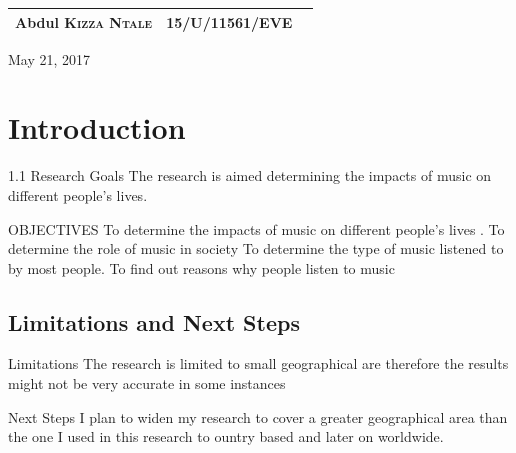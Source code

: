 \documentclass[12pt, a4paper]{report}
\begin{document}
\begin{titlepage}

\begin{table}[!hb]
\centering
\begin{tabular}{|l|l|l|}
\hline
Abdul \textsc{Kizza Ntale} & \textsc{15/U/11561/EVE} \\ \hline

\end{tabular}
\end{table}

{\large May 21, 2017}

\vfill

\end{titlepage}

\tableofcontents
\newpage

\sectionfont{\scshape}
\section*{Introduction}
1.1 Research Goals
The research is aimed determining the impacts of music on different people’s lives.

OBJECTIVES
 To determine the impacts of music on different  people’s lives .
 To determine the role of music in society 
 To determine the type of music listened to by most people. 
 To find out reasons why people listen to music



\subsection*{Limitations and Next Steps }
Limitations
The research is limited to small geographical are therefore the results might not be very accurate in some instances 
	Next Steps 
I plan to widen my research to cover a greater geographical area than the one I used in this research to ountry based and later on worldwide.
\end{document}
